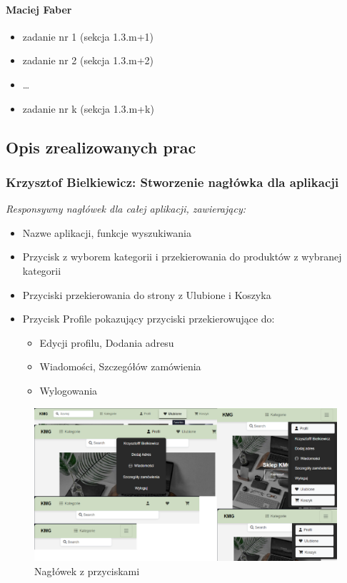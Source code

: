 \documentclass[12pt,a4paper,oneside]{article}
\theoremstyle{definition}
\numberwithin{equation}{section}
\begin{document}
\paragraph{Maciej Faber}
\begin{itemize}
\item zadanie nr 1 (sekcja 1.3.m+1)
\item zadanie nr 2 (sekcja 1.3.m+2)
\item \dots
\item zadanie nr k (sekcja 1.3.m+k)

\end{itemize}

\subsection {Opis zrealizowanych prac}
\subsubsection{Krzysztof Bielkiewicz: Stworzenie nagłówka dla aplikacji}
\label{1.3.1}
\textit{Responsywny nagłówek dla całej aplikacji, zawierający:}
\begin{itemize}
    \item Nazwe aplikacji, funkcje wyszukiwania
    \item Przycisk z wyborem kategorii i przekierowania do produktów z wybranej kategorii
    \item Przyciski przekierowania do strony z Ulubione i Koszyka
    \item Przycisk Profile pokazujący przyciski przekierowujące do:
        \begin{itemize}
            \item Edycji profilu, Dodania adresu
            \item Wiadomości, Szczegółów zamówienia
            \item Wylogowania
        \end{itemize}
\end{itemize}

\begin{figure}[H]
    \centering
    \includegraphics[width=0.9\columnwidth]{images/krzysztofBImages/header.png}
    \caption{Nagłówek z przyciskami}
\end{figure}
\end{document}
